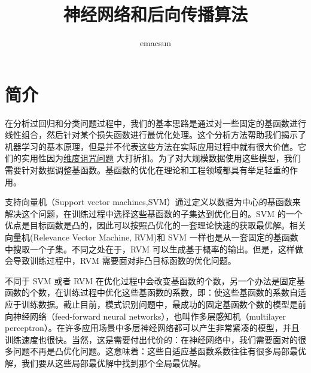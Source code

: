 \documentclass[10pt,a4paper,UTF8]{article}
\author{emacsun}
\date{}
\title{神经网络和后向传播算法}
\begin{document}
\maketitle
\tableofcontents
{}

\section{简介}
\label{sec:org0e4c8a5}


在分析过回归和分类问题过程中，我们的基本思路是通过对一些固定的基函数进行线性组合，然后针对某个损失函数进行最优化处理。这个分析方法帮助我们揭示了机器学习的基本原理，但是并不代表这些方法在实际应用过程中就有很大价值。它们的实用性因为\href{PRMLch1dot4-curse-of-dimensionality.org}{维度诅咒问题} 大打折扣。为了对大规模数据使用这些模型，我们需要针对数据调整基函数。基函数的优化在理论和工程领域都具有举足轻重的作用。

支持向量机（Support vector machines,SVM）通过定义以数据为中心的基函数来解决这个问题，在训练过程中选择这些基函数的子集达到优化目的。SVM 的一个优点是目标函数是凸的，因此可以按照凸优化的一套理论快速的获取最优解。相关向量机(Relevance Vector Machine, RVM)和 SVM 一样也是从一套固定的基函数中搜取一个子集。不同之处在于，RVM 可以生成基于概率的输出。但是，这样做会导致训练过程中，RVM 需要面对非凸目标函数的优化问题。

不同于 SVM 或者 RVM 在优化过程中会改变基函数的个数，另一个办法是固定基函数的个数，在训练过程中优化这些基函数的系数，即：使这些基函数的系数自适应于训练数据。截止目前，模式识别问题中，最成功的固定基函数个数的模型是前向神经网络（feed-forward neural networks），也叫作多层感知机（multilayer perceptron）。在许多应用场景中多层神经网络都可以产生非常紧凑的模型，并且训练速度也很快。当然，这是需要付出代价的：在神经网络中，我们需要面对的很多问题不再是凸优化问题。这意味着：这些自适应基函数系数往往有很多局部最优解，我们要从这些局部最优解中找到那个全局最优解。
\end{document}
